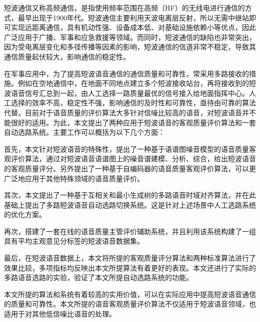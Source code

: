 \begin{cabstract}

  短波通信又称高频通信，是指使用频率范围在高频（HF）的无线电进行通信的方式，最早出现于1900年代。短波通信主要利用天波电离层反射，所以无需中继站即可实现远距离通信，具有机动性强、设备成本低、对基础设施依赖小等优点，因此广泛应用于广播、军事和应急救援等领域。而同时，短波通信的缺陷也非常突出，因为受电离层变化和多径传播等因素的影响，短波通信的信道非常不稳定，导致其通信质量起伏较大，影响通信的稳定性。
  
  在军事应用中，为了提高短波语音通信的通信质量和可靠性，常采用多路接收的措施。例如在空地通信中，在地面不同地点建立多个短波接收站台，再将接收到的短波语音信号汇总到一起，由人工选择一路质量最优的信号接入给地面指挥中心。人工选择的效率不高，稳定性不强，影响通信的及时性和可靠性，亟待由可靠的算法代替。目前对于语音质量的评价算法大多针对信噪比较高的语音，对短波语音并不能很好的适用。为此，本文提出了两种应用于短波语音的客观质量评价算法和一套自动选路系统。主要工作可以概括为以下几个方面：

  首先，本文针对短波语音的特殊性，提出了一种基于语谱图噪音模型的语音质量客观评价算法，通过对短波语音语谱图上的噪音谱建模、分析、综合，给出短波语音的客观质量评分。另外提出了一种基于自编码器的语音质量客观评价算法，可以更广泛地应用于其他特殊领域的语音质量评价。

  其次，本文提出了一种基于互相关和最小生成树的多路语音时域对齐算法，并在此基础上提出了多路短波语音自动选路切换系统。这是针对上述场景中人工选路系统的优化方案。

  再次，搭建了一套在线的语音质量主管评价辅助系统，并且利用该系统构建了一组具有平均主观意见分标签的短波语音数据集。

  最后，在短波语音数据上，本文将所提的客观质量评分算法和两种标准算法进行了效果比较，多项指标均反映出本文所提算法有着更好的表现。本文还进行了实际的多路语音选路的实验，验证了本文所提自动选路系统的功能。

  本文所提的算法和系统有着较高的实用价值，可以在实际应用中提高短波语音通信的质量和可靠性。本文所提的语音客观质量评价算法不仅适用于短波语音领域，也适用于对其他低信噪比语音的处理。

\end{cabstract}


